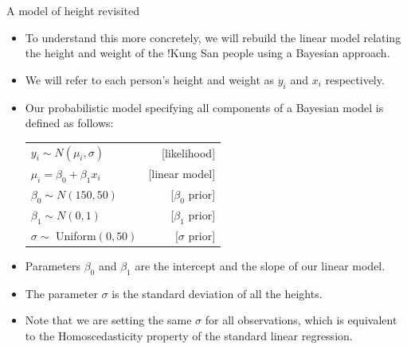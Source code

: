 \documentclass[handout]{beamer}
\begin{document}
\begin{frame}{A model of height revisited}
\scriptsize{
\begin{itemize}
 \item   To understand this more concretely, we will rebuild the linear model relating the height and weight of the !Kung San people using a Bayesian approach.
 
 \item We will refer to each person's height and weight as $y_i$ and $x_i$ respectively.
 
 \item Our probabilistic model specifying all components of a Bayesian model is defined as follows:
 
 \vspace{0.3cm}
 \begin{table}
 \centering
 \begin{tabular}{lr}  
$y_i \sim N(\mu_i,\sigma)$ & [likelihood] \\
$\mu_i = \beta_0 + \beta_1 x_i$ & [linear model] \\
$\beta_0 \sim N(150,50)$ & [$\beta_0$ prior] \\
$\beta_1 \sim N(0,1)$ & [$\beta_1$ prior] \\
$\sigma \sim $ Uniform$(0,50)$ & [$\sigma$ prior] \\
\end{tabular}
\end{table}

 \vspace{0.3cm}

 \item   Parameters $\beta_0$ and $\beta_1$ are the intercept and the slope of our linear model.
 
 \item The parameter $\sigma$ is the standard deviation of all the heights.
 
 \item Note that we are setting the same $\sigma$ for all observations, which is equivalent to the Homoscedasticity property of the standard linear regression. 
 


 
\end{itemize}
 

 
}
\end{frame}
\end{document}
